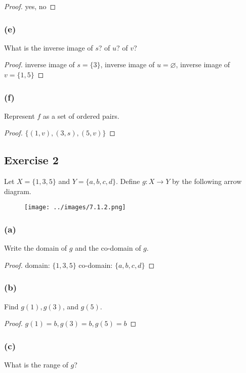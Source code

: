 \documentclass[14pt]{extarticle}
\newcommand{\es}{\varnothing}
\begin{document}
\begin{proof}
    yes, no
\end{proof}

\subsubsection{(e)}
What is the inverse image of $s$? of $u$? of $v$?

\begin{proof}
    inverse image of \(s = \{3\}\), inverse image of \(u = \es\), inverse image of \(v = \{1, 5\}\)
\end{proof}

\subsubsection{(f)}
Represent $f$ as a set of ordered pairs.

\begin{proof}
    \(\{(1, v), (3, s), (5, v)\}\)
\end{proof}

\subsection{Exercise 2}
Let \(X = \{1, 3, 5\}\) and \(Y = \{a, b, c, d\}\). Define \(g: X \to Y\) by the following arrow diagram.

\begin{figure}[ht!]
    \centering
    \texttt{[image: ../images/7.1.2.png]}
\end{figure}

\subsubsection{(a)}
Write the domain of $g$ and the co-domain of $g$.

\begin{proof}
    domain: \(\{1, 3, 5\}\) co-domain: \(\{a,b,c,d\}\)
\end{proof}

\subsubsection{(b)}
Find $g(1), g(3)$, and $g(5)$.

\begin{proof}
    \(g(1) = b, g(3) = b, g(5) = b\)
\end{proof}

\subsubsection{(c)}
What is the range of $g$?
\end{document}
